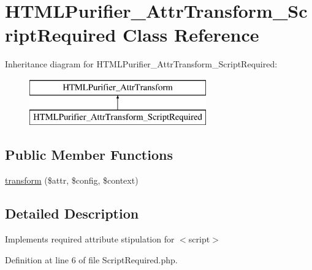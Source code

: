 \hypertarget{classHTMLPurifier__AttrTransform__ScriptRequired}{\section{H\+T\+M\+L\+Purifier\+\_\+\+Attr\+Transform\+\_\+\+Script\+Required Class Reference}
\label{classHTMLPurifier__AttrTransform__ScriptRequired}
}
Inheritance diagram for H\+T\+M\+L\+Purifier\+\_\+\+Attr\+Transform\+\_\+\+Script\+Required\+:\begin{figure}[H]
\begin{center}
\leavevmode
\includegraphics[height=2.000000cm]{classHTMLPurifier__AttrTransform__ScriptRequired}
\end{center}
\end{figure}
\subsection*{Public Member Functions}
\begin{DoxyCompactItemize}
\item 
\hyperlink{classHTMLPurifier__AttrTransform__ScriptRequired_acbdeaf5fca0d33b225488ef1fd1f4b10}{transform} (\$attr, \$config, \$context)
\end{DoxyCompactItemize}


\subsection{Detailed Description}
Implements required attribute stipulation for $<$script$>$ 

Definition at line 6 of file Script\+Required.\+php.



